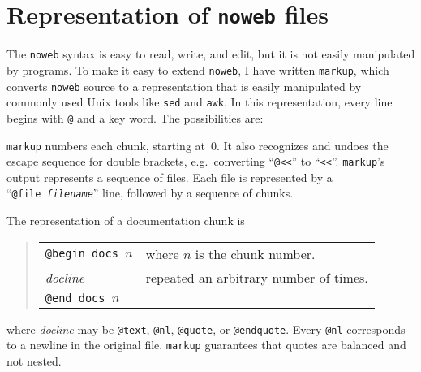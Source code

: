 \section{Representation of {\tt noweb} files}

The \verb+noweb+ syntax is easy to read, write, and edit, but it is
not easily manipulated by programs.
To make it easy to extend \verb+noweb+, I have written
\verb+markup+, which converts \verb+noweb+ source to 
 a representation that is easily manipulated
by commonly used Unix tools like {\tt sed} and {\tt awk}.
In this representation,
every line begins with {\tt @} and a key word.
The possibilities are:
\begin{quote}
\leavevmode{}
\end{quote}
{\tt markup} numbers each chunk, starting at~0.
It also recognizes and undoes the escape sequence for double brackets,
e.g.~converting ``{\tt @<<}'' to ``{\tt <<}''.
{\tt markup}'s output represents a sequence of files.
Each file is represented by a ``{\tt @file~{\it filename}}'' line,
followed by a sequence of chunks.

The representation of a documentation chunk is
\begin{quote}
\begin{tabular}{ll}
\tt @begin docs $n$&where $n$ is the chunk number.\\
{\it docline}&repeated an arbitrary number of times.\\
\tt @end docs $n$
\end{tabular}
\end{quote}
where {\it docline} may be {\tt @text}, {\tt @nl}, {\tt @quote}, or
{\tt @endquote}.
Every {\tt @nl} corresponds to a newline in the original file.
{\tt markup} guarantees that quotes are balanced and not nested.

